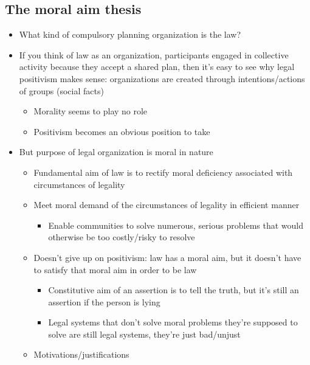 \hypertarget{the-moral-aim-thesis}{%
\subsection{The moral aim thesis}\label{the-moral-aim-thesis}}

\begin{itemize}
\tightlist
\item
  What kind of compulsory planning organization is the law?
\item
  If you think of law as an organization, participants engaged in
  collective activity because they accept a shared plan, then it's easy
  to see why legal positivism makes sense: organizations are created
  through intentions/actions of groups (social facts)

  \begin{itemize}
  \tightlist
  \item
    Morality seems to play no role
  \item
    Positivism becomes an obvious position to take
  \end{itemize}
\item
  But purpose of legal organization is moral in nature

  \begin{itemize}
  \tightlist
  \item
    Fundamental aim of law is to rectify moral deficiency associated
    with circumstances of legality
  \item
    Meet moral demand of the circumstances of legality in efficient
    manner

    \begin{itemize}
    \tightlist
    \item
      Enable communities to solve numerous, serious problems that would
      otherwise be too costly/risky to resolve
    \end{itemize}
  \item
    Doesn't give up on positivism: law has a moral aim, but it doesn't
    have to satisfy that moral aim in order to be law

    \begin{itemize}
    \tightlist
    \item
      Constitutive aim of an assertion is to tell the truth, but it's
      still an assertion if the person is lying
    \item
      Legal systems that don't solve moral problems they're supposed to
      solve are still legal systems, they're just bad/unjust
    \end{itemize}
  \item
    Motivations/justifications


\end{itemize}
\end{itemize}
